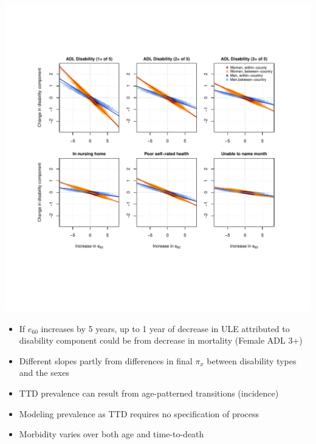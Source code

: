 \documentclass[20pt]{beamer}
\begin{document}
\begin{frame}[plain]
\begin{center}
\includegraphics[trim=1cm 0 0 2.5cm, clip, scale=1.3]{Figures/Decomp_2x3.pdf}
\end{center}
\end{frame}

\begin{frame}[plain]
\Large
\begin{itemize}[<+->]
\item If $e_{60}$ increases by 5 years, up to 1 year of decrease in ULE attributed to disability component could be from decrease in mortality (Female ADL 3+)
\item Different slopes partly from differences in final $\pi_x$ between
disability types and the sexes
\end{itemize}
\end{frame}


\begin{frame}[plain]
\Large
\begin{itemize}[<+->]
\item TTD prevalence can result from age-patterned transitions (incidence)
\item Modeling prevalence as TTD requires no specification of process
\item Morbidity varies over both age and time-to-death
\end{itemize}
\end{frame}
\end{document}
